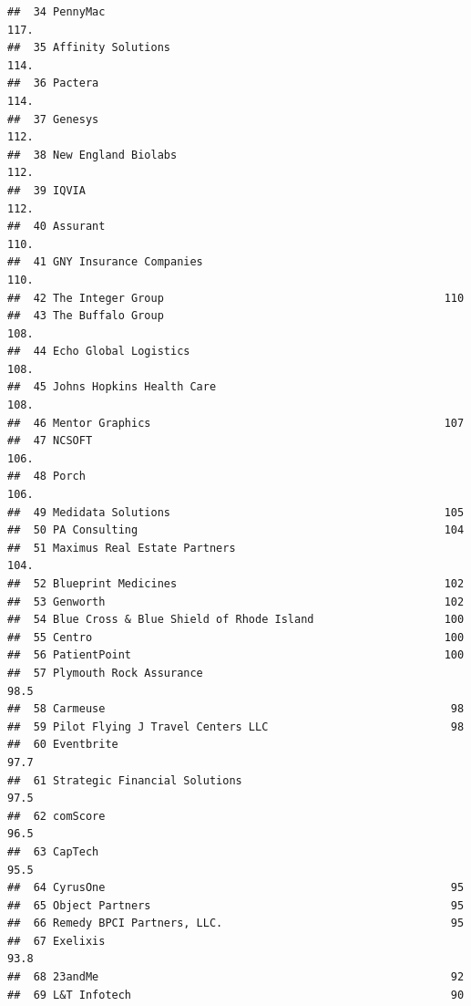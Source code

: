 \documentclass[
]{article}
\begin{document}
\begin{verbatim}
##  34 PennyMac                                                    117. 
##  35 Affinity Solutions                                          114. 
##  36 Pactera                                                     114. 
##  37 Genesys                                                     112. 
##  38 New England Biolabs                                         112. 
##  39 IQVIA                                                       112. 
##  40 Assurant                                                    110. 
##  41 GNY Insurance Companies                                     110. 
##  42 The Integer Group                                           110  
##  43 The Buffalo Group                                           108. 
##  44 Echo Global Logistics                                       108. 
##  45 Johns Hopkins Health Care                                   108. 
##  46 Mentor Graphics                                             107  
##  47 NCSOFT                                                      106. 
##  48 Porch                                                       106. 
##  49 Medidata Solutions                                          105  
##  50 PA Consulting                                               104  
##  51 Maximus Real Estate Partners                                104. 
##  52 Blueprint Medicines                                         102  
##  53 Genworth                                                    102  
##  54 Blue Cross & Blue Shield of Rhode Island                    100  
##  55 Centro                                                      100  
##  56 PatientPoint                                                100  
##  57 Plymouth Rock Assurance                                      98.5
##  58 Carmeuse                                                     98  
##  59 Pilot Flying J Travel Centers LLC                            98  
##  60 Eventbrite                                                   97.7
##  61 Strategic Financial Solutions                                97.5
##  62 comScore                                                     96.5
##  63 CapTech                                                      95.5
##  64 CyrusOne                                                     95  
##  65 Object Partners                                              95  
##  66 Remedy BPCI Partners, LLC.                                   95  
##  67 Exelixis                                                     93.8
##  68 23andMe                                                      92  
##  69 L&T Infotech                                                 90  

\end{verbatim}
\end{document}
